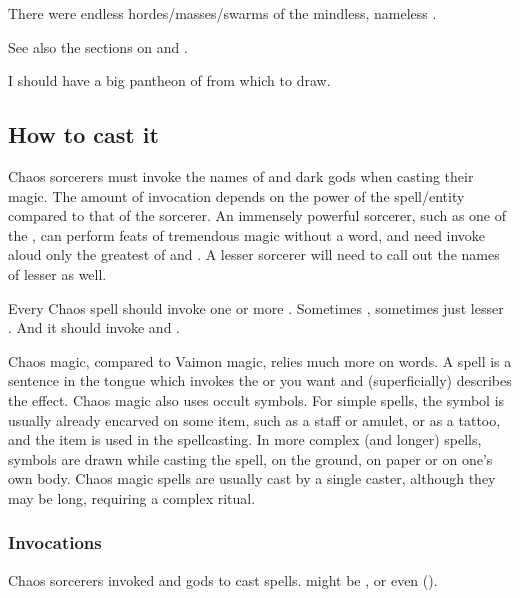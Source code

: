 There were endless hordes/masses/swarms of the mindless, nameless \daemons. 

See also the sections on  and . 

I should have a big pantheon of \daemons{} from which to draw. 







\subsection{How to cast it}
Chaos sorcerers must invoke the names of  and dark gods when casting their magic. The amount of invocation depends on the power of the spell/entity compared to that of the sorcerer. An immensely powerful sorcerer, such as one of the \shaeeroths, can perform feats of tremendous magic without a word, and need invoke aloud only the greatest of  and . A lesser sorcerer will need to call out the names of lesser \daemons{} as well. 

Every Chaos spell should invoke one or more \daemons{}. 
Sometimes \xss, sometimes just lesser \daemons. 
And it should invoke \Sethicus and \Tiamat. 

Chaos magic, compared to Vaimon magic, relies much more on words. 
A spell is a sentence in the \Draconic{} tongue which invokes the \daemon{} or \daemons{} you want and (superficially) describes the effect. 
Chaos magic also uses occult symbols. 
For simple spells, the symbol is usually already encarved on some item, such as a staff or amulet, or as a tattoo, and the item is used in the spellcasting. 
In more complex (and longer) spells, symbols are drawn while casting the spell, on the ground, on paper or on one's own body. 
Chaos magic spells are usually cast by a single caster, although they may be long, requiring a complex ritual. 




\subsubsection{Invocations}
Chaos sorcerers invoked  and gods to cast spells.
 might be , \dragons or even  (). 

